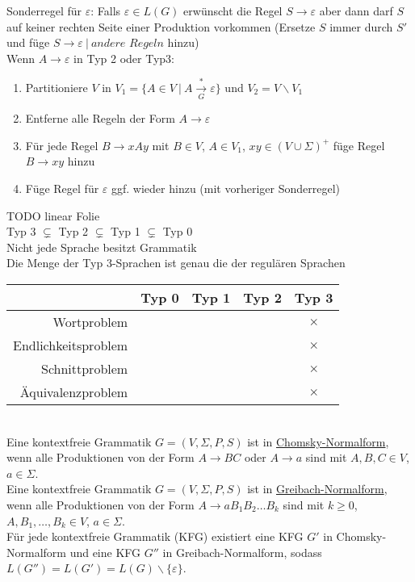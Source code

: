 \documentclass[a4paper]{article}
\newcommand{\ul}{\underline}
\let\epsilon\varepsilon
\begin{document}
Sonderregel für $\epsilon$: Falls $\epsilon\in L(G)$ erwünscht die Regel $S\rightarrow\epsilon$ aber dann darf $S$ auf keiner rechten Seite einer Produktion vorkommen (Ersetze $S$ immer durch $S'$ und füge $S\rightarrow\epsilon\ \vert\ \textit{andere Regeln}$ hinzu)\\
Wenn $A\rightarrow\epsilon$ in Typ 2 oder Typ3:
\begin{enumerate}[1.]
	\item Partitioniere $V$ in $V_1=\{A\in V\ \vert\ A\overset{*}{\underset{G}{\rightarrow}}\epsilon\}$ und $V_2=V\backslash V_1$
	\item Entferne alle Regeln der Form $A\rightarrow\epsilon$
	\item Für jede Regel $B\rightarrow xAy$ mit $B\in V$, $A\in V_1$, $xy\in (V\cup\Sigma)^+$ füge Regel $B\rightarrow xy$ hinzu
	\item Füge Regel für $\epsilon$ ggf. wieder hinzu (mit vorheriger Sonderregel)
\end{enumerate}
TODO linear Folie\\
Typ 3 $\subsetneq$ Typ 2 $\subsetneq$ Typ 1 $\subsetneq$ Typ 0\\
Nicht jede Sprache besitzt Grammatik\\
Die Menge der Typ 3-Sprachen ist genau die der regulären Sprachen\\
\begin{tabular}{|r|c|c|c|c|}\hline
	& Typ 0 & Typ 1 & Typ 2 & Typ 3\\\hline
	Wortproblem & & & \ & $\times$\\\hline
	Endlichkeitsproblem & & & & $\times$\\\hline
	Schnittproblem & & & & $\times$\\\hline
	Äquivalenzproblem & & & & $\times$\\\hline
\end{tabular}\\
Eine kontextfreie Grammatik $G=(V,\Sigma,P,S)$ ist in \ul{Chomsky-Normalform}, wenn alle Produktionen von der Form $A\rightarrow BC$ oder $A\rightarrow a$ sind mit $A,B,C\in V$, $a\in\Sigma$.\\
Eine kontextfreie Grammatik $G=(V,\Sigma,P,S)$ ist in \ul{Greibach-Normalform}, wenn alle Produktionen von der Form $A\rightarrow aB_1B_2\dots B_k$ sind mit $k \geq 0$, $A,B_1,\dots,B_k\in V$, $a\in \Sigma$.\\
Für jede kontextfreie Grammatik (KFG) existiert eine KFG $G'$ in Chomsky-Normalform und eine KFG $G''$ in Greibach-Normalform, sodass $L(G'')=L(G')=L(G)\backslash\{\epsilon\}$.\\
\end{document}
